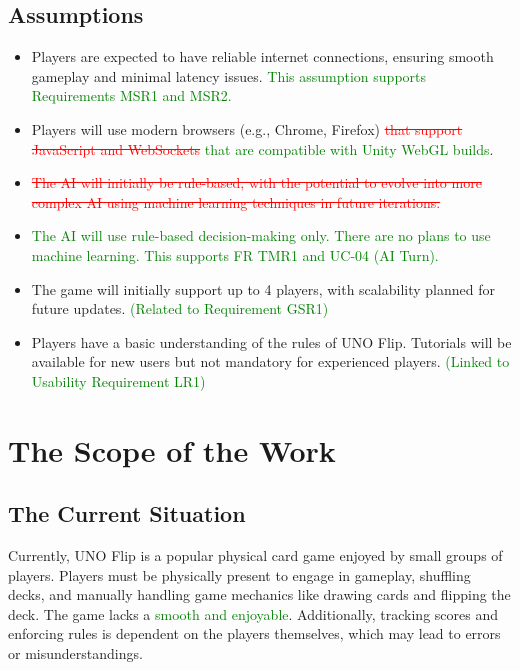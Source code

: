 \documentclass[12pt]{article}
\newcommand{\removed}[1]{\textcolor{red}{\sout{#1}}}
\newcommand{\added}[1]{\textcolor{green}{#1}}
\begin{document}
\subsection{Assumptions}
\begin{itemize}
    \item Players are expected to have reliable internet connections, ensuring smooth gameplay and minimal latency issues. \added{This assumption supports Requirements MSR1 and MSR2.}
    \item Players will use modern browsers (e.g., Chrome, Firefox) \removed{that support JavaScript and WebSockets} \added{that are compatible with Unity WebGL builds}.
    \item \removed{The AI will initially be rule-based, with the potential to evolve into more complex AI using machine learning techniques in future iterations.}
    \item \added{The AI will use rule-based decision-making only. There are no plans to use machine learning. This supports FR TMR1 and UC-04 (AI Turn).}
    \item The game will initially support up to 4 players, with scalability planned for future updates. \added{(Related to Requirement GSR1)}
    \item Players have a basic understanding of the rules of UNO Flip. Tutorials will be available for new users but not mandatory for experienced players. \added{(Linked to Usability Requirement LR1)}
\end{itemize}

\section{The Scope of the Work}

\subsection{The Current Situation}
Currently, UNO Flip is a popular physical card game enjoyed by small groups of players. Players must be physically present to engage in gameplay, shuffling decks, and manually handling game mechanics like drawing cards and flipping the deck. The game lacks a \added{smooth and enjoyable}. Additionally, tracking scores and enforcing rules is dependent on the players themselves, which may lead to errors or misunderstandings.
\end{document}
